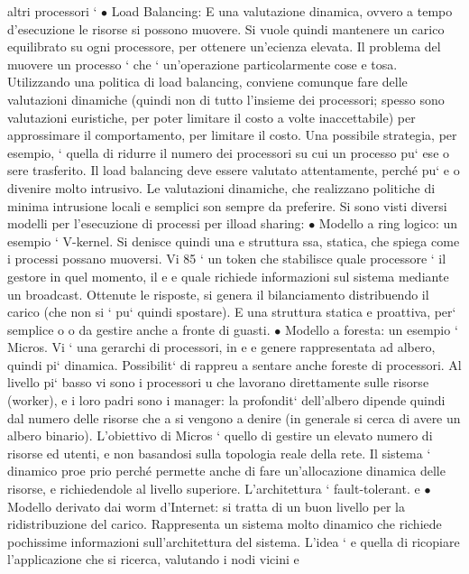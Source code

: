 \documentclass[a4paper,12pt]{article}
\begin{document}
altri processori
`
$\bullet$ Load Balancing: E una valutazione dinamica, ovvero a tempo d'esecuzione
le risorse si possono muovere. Si vuole quindi mantenere un carico equilibrato su ogni processore, per ottenere
un'ecienza elevata.
Il problema del muovere un processo ` che ` un'operazione particolarmente cose
e
tosa. Utilizzando una politica di load balancing, conviene comunque fare delle
valutazioni dinamiche (quindi non di tutto l'insieme dei processori; spesso sono
valutazioni euristiche, per poter limitare il costo a volte inaccettabile) per approssimare il comportamento, per
limitare il costo. Una possibile strategia, per
esempio, ` quella di ridurre il numero dei processori su cui un processo pu` ese
o
sere trasferito. Il load balancing deve essere valutato attentamente, perché pu`
e o
divenire molto intrusivo. Le valutazioni dinamiche, che realizzano politiche di
minima intrusione locali e semplici son sempre da preferire.
Si sono visti diversi modelli per l'esecuzione di processi per ilload sharing:
$\bullet$ Modello a ring logico: un esempio ` V-kernel. Si denisce quindi una
e
struttura ssa, statica, che spiega come i processi possano muoversi. Vi
85
` un token che stabilisce quale processore ` il gestore in quel momento, il
e
e
quale richiede informazioni sul sistema mediante un broadcast. Ottenute
le risposte, si genera il bilanciamento distribuendo il carico (che non si
`
pu` quindi spostare). E una struttura statica e proattiva, per` semplice
o
o
da gestire anche a fronte di guasti.
$\bullet$ Modello a foresta: un esempio ` Micros. Vi ` una gerarchi di processori, in
e
e
genere rappresentata ad albero, quindi pi` dinamica. Possibilit` di rappreu
a
sentare anche foreste di processori. Al livello pi` basso vi sono i processori
u
che lavorano direttamente sulle risorse (worker), e i loro padri sono i manager: la profondit` dell'albero dipende
quindi dal numero delle risorse che
a
si vengono a denire (in generale si cerca di avere un albero binario). L'obiettivo di Micros ` quello di gestire un
elevato numero di risorse ed utenti,
e
non basandosi sulla topologia reale della rete. Il sistema ` dinamico proe
prio perché permette anche di fare un'allocazione dinamica delle risorse,
e
richiedendole al livello superiore. L'architettura ` fault-tolerant.
e
$\bullet$ Modello derivato dai worm d'Internet: si tratta di un buon livello per
la ridistribuzione del carico. Rappresenta un sistema molto dinamico che
richiede pochissime informazioni sull'architettura del sistema. L'idea `
e
quella di ricopiare l'applicazione che si ricerca, valutando i nodi vicini e
\end{document}
